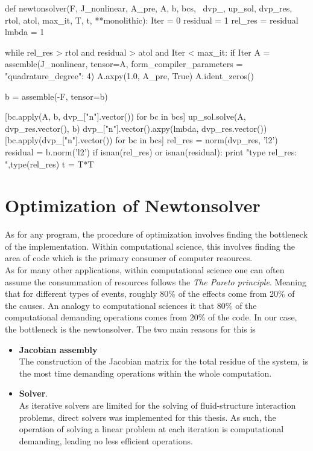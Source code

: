 \begin{python}[caption=newtonsolver.py]
def newtonsolver(F, J_nonlinear, A_pre, A, b, bcs, \
              dvp_, up_sol, dvp_res, rtol, atol, max_it, T, t, **monolithic):
    Iter      = 0
    residual   = 1
    rel_res    = residual
    lmbda = 1

    while rel_res > rtol and residual > atol and Iter < max_it:
        if Iter %
            A = assemble(J_nonlinear, tensor=A, form_compiler_parameters = {"quadrature_degree": 4}) 
            A.axpy(1.0, A_pre, True)
            A.ident_zeros()

        b = assemble(-F, tensor=b)

        [bc.apply(A, b, dvp_["n"].vector()) for bc in bcs]
        up_sol.solve(A, dvp_res.vector(), b)
        dvp_["n"].vector().axpy(lmbda, dvp_res.vector())
        [bc.apply(dvp_["n"].vector()) for bc in bcs]
        rel_res = norm(dvp_res, 'l2')
        residual = b.norm('l2')
        if isnan(rel_res) or isnan(residual):
            print "type rel_res: ",type(rel_res)
            t = T*T

\end{python}
\section{Optimization of Newtonsolver}
As for any program, the procedure of optimization involves finding the bottleneck of the implementation. Within computational science, this involves finding the area of code which is the primary consumer of computer resources. \\
As for many other applications, within computational science one can often assume the consummation of resources follows the \textit{The Pareto principle}. Meaning that for different types of events, roughly 80\% of the effects come from 20\% of the causes. An analogy to computational sciences it that 80\% of the computational demanding operations comes from 20\% of the code. In our case, the bottleneck is the newtonsolver. The two main reasons for this is 

\begin{itemize}
\item \textbf{Jacobian assembly} \\
The construction of the Jacobian matrix for the total residue of the system, is the most time demanding operations within the whole computation. 
\item \textbf{Solver}. \\ 
As iterative solvers are limited for the solving of fluid-structure interaction problems, direct solvers was implemented for this thesis. As such, the operation of solving a linear problem at each iteration is computational demanding, leading no less efficient operations. 
\end{itemize}

